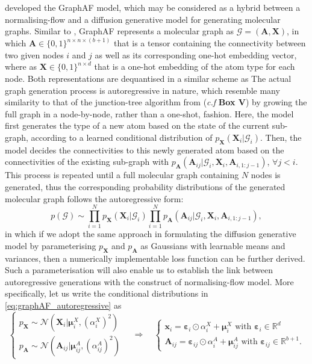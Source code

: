\citet{shi2020graphaf}  developed the GraphAF model, which may be considered as a hybrid between a normalising-flow and a diffusion generative model for generating molecular graphs. Similar to  \citet{liu2019graph}, GraphAF represents a molecular graph as $\mathcal{G}=(\bm{A},\bm{X})$, in which $\bm{A}\in\{0,1\}^{n\times n\times(b+1)}$ that is a tensor containing the connectivity between two given nodes $i$ and $j$ as well as its corresponding one-hot embedding vector, where as $\bm{X}\in\{0,1\}^{n\times d}$ that is a one-hot embedding of the atom type for each node. Both representations are dequantised in a similar scheme as \citet{madhawa2019graphnvp} The actual graph generation process is autoregressive in nature, which resemble many similarity to that of the junction-tree algorithm from  \citet{jin2018junction} (\emph{c.f} \textbf{Box V}) by growing the full graph in a node-by-node, rather than a one-shot, fashion. Here, the model first generates the type of a new atom based on the state of the current sub-graph, according to a learned conditional distribution of $p_{\bm{X}}(\bm{X}_i|\mathcal{G}_i)$. Then, the model decides the connectivities to this newly generated atom based on the connectivities of the existing sub-graph with $p_{\bm{A}}(\bm{A}_{ij}|\mathcal{G}_{i},\bm{X}_i,\bm{A}_{i,1:j-1})$, $\forall j<i$. This process is repeated until a full molecular graph containing $N$ nodes is generated, thus the corresponding probability distributions of the generated molecular graph follows the autoregressive form:
\begin{equation}
\label{eq:graphAF_autoregressive}
    p(\mathcal{G})\sim\prod_{i=1}^N p_{\bm{X}}(\bm{X}_i|\mathcal{G}_i) \prod_{i=1}^N p_{\bm{A}}(\bm{A}_{ij}|\mathcal{G}_{i},\bm{X}_i,\bm{A}_{i,1:j-1}),
\end{equation}
in which if we adopt the same approach in formulating the diffusion generative model by parameterising $p_{\bm{X}}$ and $p_{\bm{A}}$ as Gaussians with learnable means and variances, then a numerically implementable loss function can be further derived. Such a parameterisation will also enable us to establish the link between autoregressive generations with the construct of normalising-flow model. More specifically, let us write the conditional distributions in \cref{eq:graphAF_autoregressive} as
\begin{equation}
    \label{eq:graphAF_parameterisation}
    \begin{cases}
        p_{\bm{X}}\sim\mathcal{N}(\bm{X}_i|\boldsymbol{\mu}_{i}^X, (\alpha_i^X)^2 ) \\
        p_{\bm{A}}\sim \mathcal{N}(\bm{A}_{ij}|\boldsymbol{\mu}_{ij}^{A},(\alpha_{ij}^A)^2)
    \end{cases}\quad \Rightarrow \quad
    \begin{cases}
        \bm{x}_i=\boldsymbol{\varepsilon}_i\odot\alpha_i^X+\boldsymbol{\mu}_i^X\mbox{ with } \boldsymbol{\varepsilon}_i\in\mathbb{R}^{d}\\
        \bm{A}_{ij}= \boldsymbol{\varepsilon}_{ij}\odot\alpha_i^A+\boldsymbol{\mu}_{ij}^A\mbox{ with } \boldsymbol{\varepsilon}_{ij}\in\mathbb{R}^{b+1}.
    \end{cases}
\end{equation}
